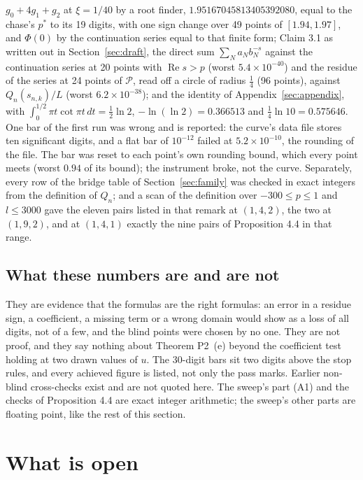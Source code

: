 \documentclass[11pt]{article}
\newcommand{\re}{\operatorname{Re}}
\begin{document}
$g_0+4g_1+g_2$ at $\xi=1/40$ by a root finder, $1.95167045813405392080$, equal to the chase's $p^*$ to its 19 digits, with one sign change over 49 points of $[1.94,1.97]$, and $\Phi(0)$ by the continuation series equal to that finite form; Claim 3.1 as written out in Section~\ref{sec:draft}, the direct sum $\sum_Na_Nb_N^{-s}$ against the continuation series at 20 points with $\re s>p$ (worst $5.4\times10^{-40}$) and the residue of the series at 24 points of $\mathcal{P}$, read off a circle of radius $\frac14$ (96 points), against $Q_n(s_{n,k})/L$ (worst $6.2\times10^{-38}$); and the identity of Appendix~\ref{sec:appendix}, with $\int_0^{1/2}\pi t\cot\pi t\,dt=\frac12\ln2$, $-\ln(\ln2)=0.366513$ and $\frac14\ln10=0.575646$. One bar of the first run was wrong and is reported: the curve's data file stores ten significant digits, and a flat bar of $10^{-12}$ failed at $5.2\times10^{-10}$, the rounding of the file. The bar was reset to each point's own rounding bound, which every point meets (worst $0.94$ of its bound); the instrument broke, not the curve. Separately, every row of the bridge table of Section~\ref{sec:family} was checked in exact integers from the definition of $Q_n$; and a scan of the definition over $-300\le p\le1$ and $l\le3000$ gave the eleven pairs listed in that remark at $(1,4,2)$, the two at $(1,9,2)$, and at $(1,4,1)$ exactly the nine pairs of Proposition 4.4 in that range.

\subsection{What these numbers are and are not}

They are evidence that the formulas are the right formulas: an error in a residue sign, a coefficient, a missing term or a wrong domain would show as a loss of all digits, not of a few, and the blind points were chosen by no one. They are not proof, and they say nothing about Theorem P2~(e) beyond the coefficient test holding at two drawn values of $u$. The 30-digit bars sit two digits above the stop rules, and every achieved figure is listed, not only the pass marks. Earlier non-blind cross-checks exist and are not quoted here. The sweep's part (A1) and the checks of Proposition 4.4 are exact integer arithmetic; the sweep's other parts are floating point, like the rest of this section.

\section{What is open}\label{sec:open}
\end{document}
